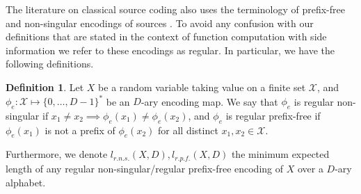 \documentclass[journal, onecolumn, draftcls]{IEEEtran}
\theoremstyle{definition}
\newtheorem{definition}{Definition}
\newcommand{\calX}{\mathcal{X}}
\newcommand{\bfX}{\mathbf{X}}
\newcommand{\bfx}{\mathbf{x}}
\newcommand{\meng}[1]{\marginpar{+}{\bf Ruoyu's remark}: {\em #1}}
\newcommand{\aditya}[1]{\marginpar{+}{\bf Aditya's remark}: {\em #1}}
\begin{document}
The literature on classical source coding also uses the terminology of prefix-free and non-singular encodings of sources \cite{CoverT05}. To avoid any confusion with our definitions that are stated in the context of function computation with side information we refer to these encodings as regular. In particular, we have the following definitions.
\begin{definition}
Let $X$ be a random variable taking value on a finite set $\calX$, and $\phi_{e}:\calX\mapsto\{0,\dots, D-1\}^*$ be an $D$-ary encoding map. We say that $\phi_{e}$ is regular non-singular if  $x_1\ne x_2 \implies \phi_{e}(x_1)\ne \phi_{e}(x_2)$, and $\phi_{e}$ is regular prefix-free if $\phi_e(x_1)$ is not a prefix of $\phi_e(x_2)$ for all distinct $x_1,x_2\in \calX$.

Furthermore, we denote $l_{r.n.s.}(X,D),l_{r.p.f.}(X,D)$ the minimum expected length of any regular non-singular/regular prefix-free encoding of $X$ over a $D$-ary alphabet. 
\end{definition}



 
\end{document}
